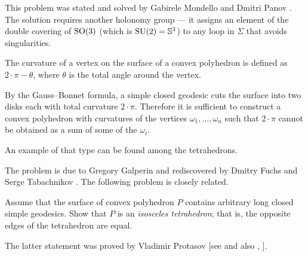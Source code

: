 This problem was stated and solved by Gabirele Mondello and Dmitri Panov \cite{mondello-panov}.
The solution requires another holonomy group ---
it assigns an element of the double covering of $\mathrm{SO}(3)$ (which is $\SU(2)\z=\mathbb{S}^3$) to any loop in $\Sigma$ that avoids singularities.


The curvature of a vertex on the surface of a convex polyhedron
is defined as $2\cdot\pi-\theta$, where $\theta$ is the total angle around the vertex.

By the Gauss--Bonnet formula, a simple closed geodesic cuts the surface into two disks each with total curvature $2\cdot\pi$.
Therefore it is sufficient to construct a convex polyhedron with curvatures of the vertices $\omega_1,\dots,\omega_n$ such that
$2\cdot\pi$ cannot be obtained as a sum of some of the $\omega_i$.

An example of that type can be found among the tetrahedrons.
\qeds

The problem is due to Gregory Galperin \cite{galperin} 
and rediscovered by Dmitry Fuchs and Serge Tabachnikov \cite[see 20.8 in][]{fuchs-tabachnikov}.
The following problem is closely related.

\begin{pr}
Assume that the surface of convex polyhedron $P$ contains arbitrary long closed simple geodesics. 
Show that $P$ is an \emph{isosceles tetrahedron};
that is, the opposite edges of the tetrahedron are equal.
\end{pr}

The latter statement was proved by Vladimir Protasov [see  and also , ].

